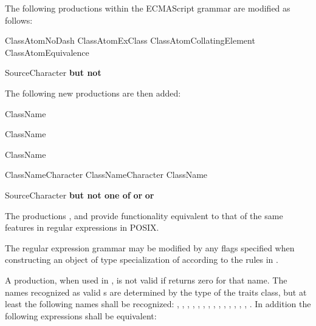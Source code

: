 \pnum
The following productions within the ECMAScript grammar are modified as follows:

\begin{ncrebnf}
\br
  \terminal{-}\br
  ClassAtomNoDash\br
  ClassAtomExClass\br
  ClassAtomCollatingElement\br
  ClassAtomEquivalence
\end{ncrebnf}

\begin{ncrebnf}
\br
  SourceCharacter \textnormal{\textbf{but not}} 
\end{ncrebnf}

\pnum
The following new productions are then added:

\begin{ncrebnf}
\br
  \terminal{[:} ClassName \terminal{:]}
\end{ncrebnf}

\begin{ncrebnf}
\br
  \terminal{[.} ClassName \terminal{.]}
\end{ncrebnf}

\begin{ncrebnf}
\br
  \terminal{[=} ClassName \terminal{=]}
\end{ncrebnf}

\begin{ncrebnf}
\br
  ClassNameCharacter\br
  ClassNameCharacter ClassName
\end{ncrebnf}

\begin{ncrebnf}
\br
  SourceCharacter \textnormal{\textbf{but not one of}}  \textnormal{\textbf{or}} \terminal{=} \textnormal{\textbf{or}} \terminal{:}
\end{ncrebnf}

\pnum
The productions , 
and  provide functionality
equivalent to that of the same features in regular expressions in POSIX.

\pnum
The regular expression grammar may be modified by
any  flags specified when
constructing an object of type specialization of 
according to the rules in .

\pnum
A  production, when used in ,
is not valid if  returns zero for
that name.  The names recognized as valid s are
determined by the type of the traits class, but at least the following
names shall be recognized:
, , , , ,
, , , , ,
, , , , .
In addition the following expressions shall be equivalent:

